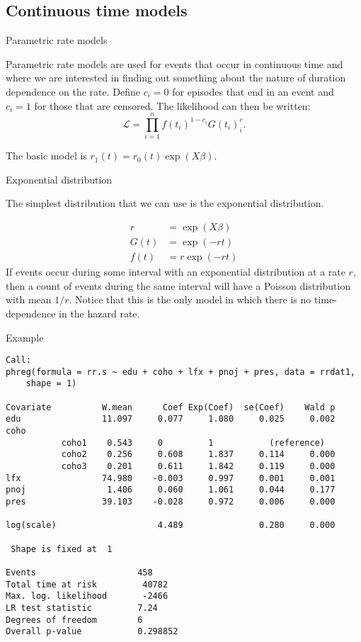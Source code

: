 \documentclass[10pt,ignorenonframetext,]{beamer}
\begin{document}
\subsection{Continuous time models}\label{continuous-time-models}

\begin{frame}{Parametric rate models}

Parametric rate models are used for events that occur in continuous time
and where we are interested in finding out something about the nature of
duration dependence on the rate. Define \(c_i = 0\) for episodes that
end in an event and \(c_i=1\) for those that are censored. The
likelihood can then be written: \[
\mathcal{L} = \prod_{i=1}^n f(t_i)^{1-c_i} G(t_i)^c_i.
\]

The basic model is \(r_1(t) = r_0(t) \exp(X\beta).\)

\end{frame}

\begin{frame}{Exponential distribution}

The simplest distribution that we can use is the exponential
distribution.

\[
\begin{aligned}
r &= \exp(X\beta)\\
G(t) &= \exp(-r t)\\
f(t) &= r \exp(-r t)
\end{aligned}
\] If events occur during some interval with an exponential distribution
at a rate \(r\), then a count of events during the same interval will
have a Poisson distribution with mean \(1/r\). Notice that this is the
only model in which there is no time-dependence in the hazard rate.

\end{frame}

\begin{frame}[fragile]{Example}

\scriptsize

\begin{verbatim}
Call:
phreg(formula = rr.s ~ edu + coho + lfx + pnoj + pres, data = rrdat1, 
    shape = 1)

Covariate          W.mean      Coef Exp(Coef)  se(Coef)    Wald p
edu                11.097     0.077     1.080     0.025     0.002 
coho 
           coho1    0.543     0         1           (reference)
           coho2    0.256     0.608     1.837     0.114     0.000 
           coho3    0.201     0.611     1.842     0.119     0.000 
lfx                74.980    -0.003     0.997     0.001     0.001 
pnoj                1.406     0.060     1.061     0.044     0.177 
pres               39.103    -0.028     0.972     0.006     0.000 

log(scale)                    4.489               0.280     0.000 

 Shape is fixed at  1 

Events                    458 
Total time at risk         40782 
Max. log. likelihood       -2466 
LR test statistic         7.24 
Degrees of freedom        6 
Overall p-value           0.298852
\end{verbatim}

\end{frame}
\end{document}
